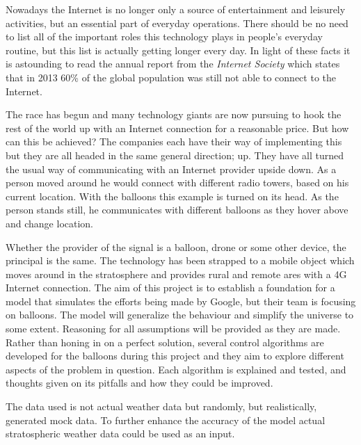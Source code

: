 Nowadays the Internet is no longer only a source of entertainment and leisurely activities, but an essential part of everyday operations. There should be no need to list all of the important roles this technology plays in people's everyday routine, but this list is actually getting longer every day. In light of these facts it is astounding to read the annual report from the \textit{Internet Society} which states that in 2013 60\% \citep{Brown} of the global population was still not able to connect to the Internet. 

The race has begun and many technology giants are now pursuing to hook the rest of the world up with an Internet connection for a reasonable price. But how can this be achieved? The companies each have their way of implementing this but they are all headed in the same general direction; up. They have all turned the usual way of communicating with an Internet provider upside down. As a person moved around he would connect with different radio towers, based on his current location. With the balloons this example is turned on its head. As the person stands still, he communicates with different balloons as they hover above and change location.

Whether the provider of the signal is a balloon, drone or some other device, the principal is the same. The technology has been strapped to a mobile object which moves around in the stratosphere and provides rural and remote ares with a 4G Internet connection. The aim of this project is to establish a foundation for a model that simulates the efforts being made by Google, but their team is focusing on balloons. The model will generalize the behaviour and simplify the universe to some extent. Reasoning for all assumptions will be provided as they are made. Rather than honing in on a perfect solution, several control algorithms are developed for the balloons  during this project and they aim to explore different aspects of the problem in question. Each algorithm is explained and tested, and thoughts given on its pitfalls and how they could be improved.

The data used is not actual weather data but randomly, but realistically, generated mock data. To further enhance the accuracy of the model actual stratospheric weather data could be used as an input.